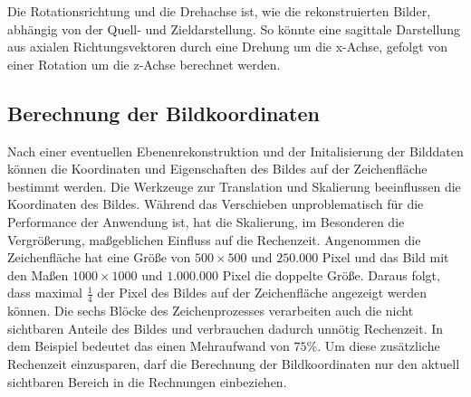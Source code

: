 Die Rotationsrichtung und die Drehachse ist, wie die rekonstruierten Bilder, abhängig von der Quell- und Zieldarstellung. So könnte eine sagittale Darstellung aus axialen Richtungsvektoren durch eine Drehung um die x-Achse, gefolgt von einer Rotation um die z-Achse berechnet werden.

\FloatBarrier

\subsection{Berechnung der Bildkoordinaten}
Nach einer eventuellen Ebenenrekonstruktion und der Initalisierung der Bilddaten können die Koordinaten und Eigenschaften des Bildes auf der Zeichenfläche bestimmt werden. 
Die Werkzeuge zur Translation und Skalierung beeinflussen die Koordinaten des Bildes. Während das Verschieben unproblematisch für die Performance der Anwendung ist, hat die Skalierung, im Besonderen die Vergrößerung, maßgeblichen Einfluss auf die Rechenzeit. Angenommen die Zeichenfläche hat eine Größe von $500 \times 500$ und $250.000$ Pixel und das Bild mit den Maßen $1000 \times 1000$  und $1.000.000$ Pixel die doppelte Größe. Daraus folgt, dass maximal $\frac{1}{4}$ der Pixel des Bildes auf der Zeichenfläche angezeigt werden können. Die sechs Blöcke des Zeichenprozesses verarbeiten auch die nicht sichtbaren Anteile des Bildes und verbrauchen dadurch unnötig Rechenzeit. In dem Beispiel bedeutet das einen Mehraufwand von $75\%$. Um diese zusätzliche Rechenzeit einzusparen, darf die Berechnung der Bildkoordinaten nur den aktuell sichtbaren Bereich in die Rechnungen einbeziehen.\\

